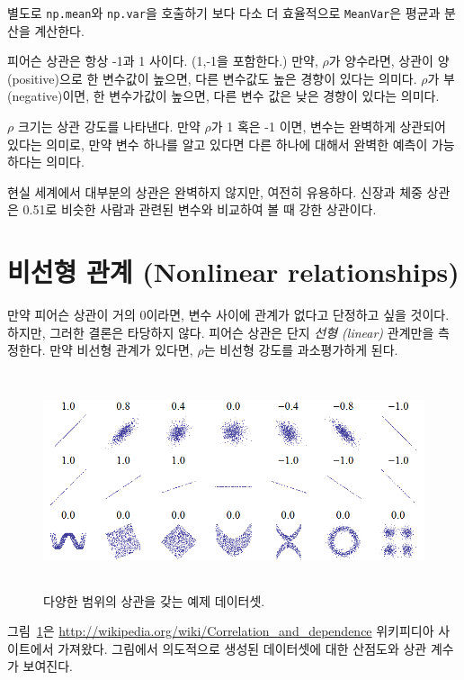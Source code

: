 별도로 {\tt np.mean}와 {\tt np.var}을 호출하기 보다 다소 더 효율적으로 {\tt MeanVar}은 평균과 분산을 계산한다.

피어슨 상관은 항상 -1과 1 사이다. (1,-1을 포함한다.) 만약, $\rho$가 양수라면, 상관이 양(positive)으로 한 변수값이 높으면, 다른 변수값도 높은 경향이 있다는 의미다. $\rho$가 부(negative)이면, 한 변수가값이 높으면, 다른 변수 값은 낮은 경향이 있다는 의미다.

$\rho$ 크기는 상관 강도를 나타낸다. 만약 $\rho$가 1 혹은 -1 이면, 변수는 완벽하게 상관되어 있다는 의미로, 만약 변수 하나를 알고 있다면 다른 하나에 대해서 완벽한 예측이 가능하다는 의미다.

현실 세계에서 대부분의 상관은 완벽하지 않지만, 여전히 유용하다.
신장과 체중 상관은 0.51로 비슷한 사람과 관련된 변수와 비교하여 볼 때 강한 상관이다.

\section{비선형 관계 (Nonlinear relationships)}

만약 피어슨 상관이 거의 0이라면, 변수 사이에 관계가 없다고 단정하고 싶을 것이다. 하지만, 그러한 결론은 타당하지 않다. 피어슨 상관은 단지 {\em
  선형 (linear)} 관계만을 측정한다. 만약 비선형 관계가 있다면, $\rho$는 비선형 강도를 과소평가하게 된다.


\begin{figure}
\centerline{\includegraphics[height=2.5in]{figs/Correlation_examples.png}}
\caption{다양한 범위의 상관을 갖는 예제 데이터셋.}
\label{corr_examples}
\end{figure}

그림~\ref{corr_examples}은 \url{http://wikipedia.org/wiki/Correlation_and_dependence} 위키피디아 사이트에서 가져왔다.
그림에서 의도적으로 생성된 데이터셋에 대한 산점도와 상관 계수가 보여진다.


